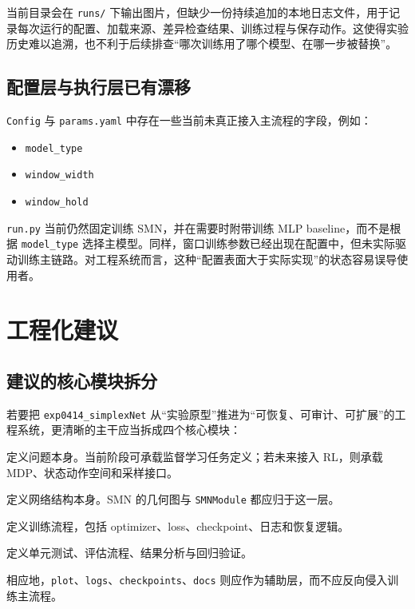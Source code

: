 \documentclass[11pt,fontset=none]{ctexart}
\begin{document}
当前目录会在 \texttt{runs/} 下输出图片，但缺少一份持续追加的本地日志文件，用于记录每次运行的配置、加载来源、差异检查结果、训练过程与保存动作。这使得实验历史难以追溯，也不利于后续排查“哪次训练用了哪个模型、在哪一步被替换”。

\subsection{配置层与执行层已有漂移}

\texttt{Config} 与 \texttt{params.yaml} 中存在一些当前未真正接入主流程的字段，例如：
\begin{itemize}[leftmargin=2em]
  \item \texttt{model\_type}
  \item \texttt{window\_width}
  \item \texttt{window\_hold}
\end{itemize}

\texttt{run.py} 当前仍然固定训练 SMN，并在需要时附带训练 MLP baseline，而不是根据 \texttt{model\_type} 选择主模型。同样，窗口训练参数已经出现在配置中，但未实际驱动训练主链路。对工程系统而言，这种“配置表面大于实际实现”的状态容易误导使用者。

\section{工程化建议}

\subsection{建议的核心模块拆分}

若要把 \texttt{exp0414\_simplexNet} 从“实验原型”推进为“可恢复、可审计、可扩展”的工程系统，更清晰的主干应当拆成四个核心模块：
\begin{description}[leftmargin=2em,style=nextline]
  \item[\texttt{problem}] 定义问题本身。当前阶段可承载监督学习任务定义；若未来接入 RL，则承载 MDP、状态动作空间和采样接口。
  \item[\texttt{model}] 定义网络结构本身。SMN 的几何图与 \texttt{SMNModule} 都应归于这一层。
  \item[\texttt{train}] 定义训练流程，包括 optimizer、loss、checkpoint、日志和恢复逻辑。
  \item[\texttt{test/eval}] 定义单元测试、评估流程、结果分析与回归验证。
\end{description}

相应地，\texttt{plot}、\texttt{logs}、\texttt{checkpoints}、\texttt{docs} 则应作为辅助层，而不应反向侵入训练主流程。
\end{document}
